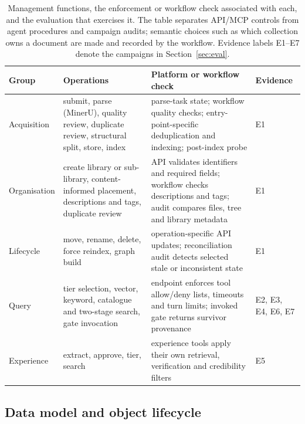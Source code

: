 \begin{table}[t]
\centering
\small
\setlength{\tabcolsep}{4pt}
\caption{Management functions, the enforcement or workflow check associated
with each, and the evaluation that exercises it. The table separates API/MCP
controls from agent procedures and campaign audits; semantic choices such as
which collection owns a document are made and recorded by the workflow.
Evidence labels E1--E7 denote the campaigns in Section~\ref{sec:eval}.}
\label{tab:functions}
\begin{tabular}{@{}>{\raggedright\arraybackslash}p{}>{\raggedright\arraybackslash}p{}>{\raggedright\arraybackslash}p{}>{\raggedright\arraybackslash}p{}@{}}
\toprule
Group & Operations & Platform or workflow check & Evidence\\
\midrule
Acquisition & submit, parse (MinerU), quality review, duplicate review, structural split, store, index & parse-task state; workflow quality checks; entry-point-specific deduplication and indexing; post-index probe & E1\\
Organisation & create library or sub-library, content-informed placement, descriptions and tags, duplicate review & API validates identifiers and required fields; workflow checks descriptions and tags; audit compares files, tree and library metadata & E1\\
Lifecycle & move, rename, delete, force reindex, graph build & operation-specific API updates; reconciliation audit detects selected stale or inconsistent state & E1\\
Query & tier selection, vector, keyword, catalogue and two-stage search, gate invocation & endpoint enforces tool allow/deny lists, timeouts and turn limits; invoked gate returns survivor provenance & E2, E3, E4, E6, E7\\
Experience & extract, approve, tier, search & experience tools apply their own retrieval, verification and credibility filters & E5\\
\bottomrule
\end{tabular}
\end{table}

\subsection{Data model and object lifecycle}
\label{sec:datamodel}
\label{sec:lifecycle}

